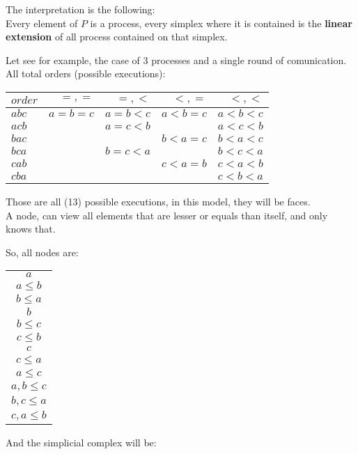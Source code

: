 \documentclass{tufte-book} %
\begin{document}
The interpretation is the following:\\
Every element of $P$ is a process, every simplex where it is contained is the {\bf linear extension} of all process contained on that simplex.

Let see for example, the case of 3 processes and a single round of comunication.\\


All total orders (possible executions):

\begin{tabular}{ l | r r r r}
  \hline                       
$ order$ & $=,=$ & $=,<$ & $<,=$ & $<,<$\\
  \hline                       
$a b c$ & $a=b=c$ & $a=b<c$ & $a<b=c$ & $a<b<c$\\
$a c b$ &         & $a=c<b$ &         & $a<c<b$\\
$b a c$ &         &         & $b<a=c$ & $b<a<c$\\
$b c a$ &         & $b=c<a$ &         & $b<c<a$\\
$c a b$ &         &         & $c<a=b$ & $c<a<b$\\
$c b a$ &         &         &         & $c<b<a$\\
  \hline  
\end{tabular}

Those are all (13) possible executions, in this model, they will be faces.\\
A node, can view all elements that are lesser or equals than itself, and only knows that.

So, all nodes are:
\begin{tabular}{ c}
  \hline                       
$a$ \\
$a \le b$ \\
$b \le a$ \\
$b$ \\
$b \le c$ \\
$c \le b$ \\
$c$ \\
$c \le a$ \\
$a \le c$ \\
$ {a,b} \le c$ \\
$ {b,c} \le a$ \\
$ {c,a} \le b$ \\
  \hline  
\end{tabular}


And the simplicial complex will be:
\end{document}
